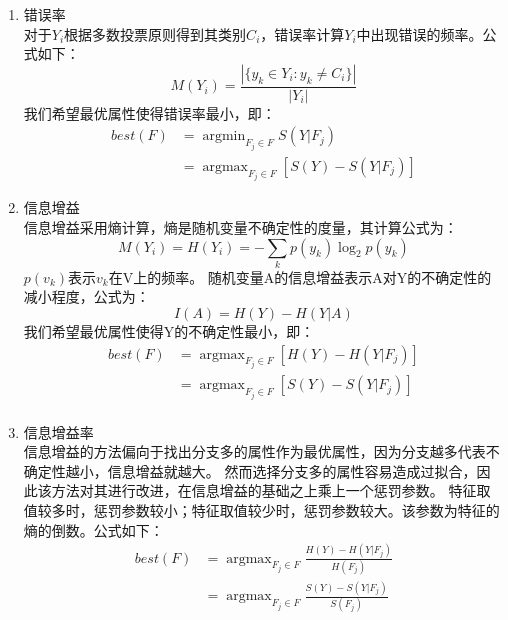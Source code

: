 \documentclass[UTF8,a4paper,12pt]{article}
\begin{document}
\begin{enumerate}[itemindent=0.5em,label=\arabic*、]
  \item 错误率\\
  对于$Y_i$根据多数投票原则得到其类别$C_i$，错误率计算$Y_i$中出现错误的频率。公式如下：
  \begin{equation}
    M(Y_i)= \frac{|\{y_k \in Y_i: y_k \neq C_i\}|}{|Y_i|}
  \end{equation}
  我们希望最优属性使得错误率最小，即：
  \begin{equation}
    \begin{aligned}
      best(F) &= \mathop{\arg\min}_{F_j \in F}{S(Y|F_j)}\\
      &= \mathop{\arg\max}_{F_j \in F}{[S(Y) - S(Y|F_j)]}
    \end{aligned}
  \end{equation}
  \item 信息增益\\
  信息增益采用熵计算，熵是随机变量不确定性的度量，其计算公式为：
  \begin{equation}
    M(Y_i) = H(Y_i) = -\sum_{k}p(y_k)\log _2p(y_k)
  \end{equation}
    $p(v_k)$表示$v_k$在V上的频率。
  随机变量A的信息增益表示A对Y的不确定性的减小程度，公式为：
  \begin{equation}
    I(A) = H(Y) - H(Y|A)
  \end{equation}
我们希望最优属性使得Y的不确定性最小，即：
\begin{equation}
  \begin{aligned}
    best(F) &= \mathop{\arg\max}_{F_j \in F}{[H(Y) - H(Y|F_j)]} \\
    &= \mathop{\arg\max}_{F_j \in F}{[S(Y) - S(Y|F_j)]}\\
  \end{aligned}
\end{equation}
  \item 信息增益率\\
  信息增益的方法偏向于找出分支多的属性作为最优属性，因为分支越多代表不确定性越小，信息增益就越大。
  然而选择分支多的属性容易造成过拟合，因此该方法对其进行改进，在信息增益的基础之上乘上一个惩罚参数。
  特征取值较多时，惩罚参数较小；特征取值较少时，惩罚参数较大。该参数为特征的熵的倒数。公式如下：
  \begin{equation}
    \begin{aligned}
      best(F) &= \mathop{\arg\max}_{F_j \in F}{\frac{H(Y) - H(Y|F_j)}{H(F_j)}}\\
      &= \mathop{\arg\max}_{F_j \in F}{\frac{S(Y) - S(Y|F_j)}{S(F_j)}}
    \end{aligned}
  \end{equation}


\end{enumerate}
\end{document}
